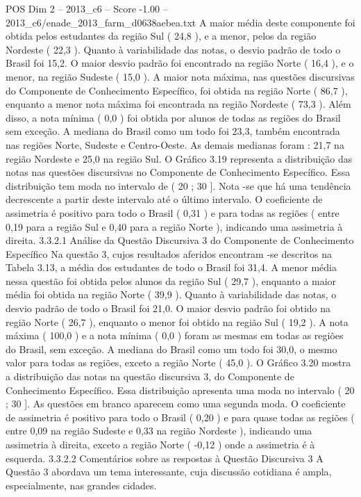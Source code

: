 \begin{textsample}{POS Dim 2 – 2013\_c6 – Score -1.00 – 2013\_c6/enade\_2013\_farm\_d0638aebea.txt}
A maior média deste componente foi obtida pelos estudantes da região Sul ( 24,8 ), e a menor, pelos da região Nordeste ( 22,3 ).
Quanto à variabilidade das notas, o desvio padrão de todo o Brasil foi 15,2.
O maior desvio padrão foi encontrado na região Norte ( 16,4 ), e o menor, na região Sudeste ( 15,0 ).
A maior nota máxima, nas questões discursivas do Componente de Conhecimento Específico, foi obtida na região Norte ( 86,7 ), enquanto a menor nota máxima foi encontrada na região Nordeste ( 73,3 ).
Além disso, a nota mínima ( 0,0 ) foi obtida por alunos de todas as regiões do Brasil sem exceção.
A mediana do Brasil como um todo foi 23,3, também encontrada nas regiões Norte, Sudeste e Centro-Oeste.
As demais medianas foram : 21,7 na região Nordeste e 25,0 na região Sul.
O Gráfico 3.19 representa a distribuição das notas nas questões discursivas no Componente de Conhecimento Específico.
Essa distribuição tem moda no intervalo de ( 20 ; 30 ].
Nota -se que há uma tendência decrescente a partir deste intervalo até o último intervalo.
O coeficiente de assimetria é positivo para todo o Brasil ( 0,31 ) e para todas as regiões ( entre 0,19 para a região Sul e 0,40 para a região Norte ), indicando uma assimetria à direita. 3.3.2.1 Análise da Questão Discursiva 3 do Componente de Conhecimento Específico Na questão 3, cujos resultados aferidos encontram -se descritos na Tabela 3.13, a média dos estudantes de todo o Brasil foi 31,4.
A menor média nessa questão foi obtida pelos alunos da região Sul ( 29,7 ), enquanto a maior média foi obtida na região Norte ( 39,9 ).
Quanto à variabilidade das notas, o desvio padrão de todo o Brasil foi 21,0.
O maior desvio padrão foi obtido na região Norte ( 26,7 ), enquanto o menor foi obtido na região Sul ( 19,2 ).
A nota máxima ( 100,0 ) e a nota mínima ( 0,0 ) foram as mesmas em todas as regiões do Brasil, sem exceção.
A mediana do Brasil como um todo foi 30,0, o mesmo valor para todas as regiões, exceto a região Norte ( 45,0 ).
O Gráfico 3.20 mostra a distribuição das notas na questão discursiva 3, do Componente de Conhecimento Específico.
Essa distribuição apresenta uma moda no intervalo ( 20 ; 30 ].
As questões em branco aparecem como uma segunda moda.
O coeficiente de assimetria é positivo para todo o Brasil ( 0,20 ) e para quase todas as regiões ( entre 0,09 na região Sudeste e 0,33 na região Nordeste ), indicando uma assimetria à direita, exceto a região Norte ( -0,12 ) onde a assimetria é à esquerda. 3.3.2.2 Comentários sobre as respostas à Questão Discursiva 3 A Questão 3 abordava um tema interessante, cuja discussão cotidiana é ampla, especialmente, nas grandes cidades.

\end{textsample}
